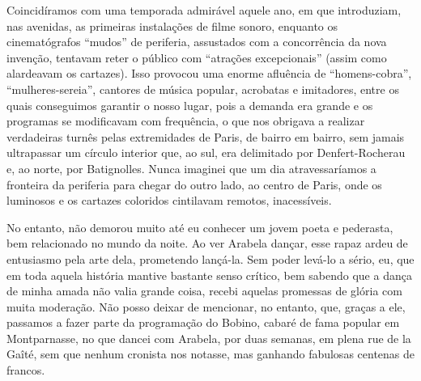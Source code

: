 Coincidíramos com uma temporada admirável aquele ano, em que
introduziam, nas avenidas, as primeiras instalações de filme sonoro,
enquanto os cinematógrafos ``mudos'' de periferia, assustados com a
concorrência da nova invenção, tentavam reter o público com ``atrações
excepcionais'' (assim como alardeavam os cartazes). Isso provocou uma
enorme afluência de ``homens-cobra'', ``mulheres-sereia'', cantores de
música popular, acrobatas e imitadores, entre os quais conseguimos
garantir o nosso lugar, pois a demanda era grande e os programas se
modificavam com frequência, o que nos obrigava a realizar verdadeiras
turnês pelas extremidades de Paris, de bairro em bairro, sem jamais
ultrapassar um círculo interior que, ao sul, era delimitado por
Denfert-Rocherau e, ao norte, por Batignolles. Nunca imaginei que um dia
atravessaríamos a fronteira da periferia para chegar do outro lado, ao
centro de Paris, onde os luminosos e os cartazes coloridos cintilavam
remotos, inacessíveis.

No entanto, não demorou muito até eu conhecer um jovem poeta e
pederasta, bem relacionado no mundo da noite. Ao ver Arabela dançar,
esse rapaz ardeu de entusiasmo pela arte dela, prometendo lançá-la. Sem
poder levá-lo a sério, eu, que em toda aquela história mantive bastante
senso crítico, bem sabendo que a dança de minha amada não valia grande
coisa, recebi aquelas promessas de glória com muita moderação. Não posso
deixar de mencionar, no entanto, que, graças a ele, passamos a fazer
parte da programação do Bobino, cabaré de fama popular em Montparnasse,
no que dancei com Arabela, por duas semanas, em plena rue de la Gaîté,
sem que nenhum cronista nos notasse, mas ganhando fabulosas centenas de
francos.


